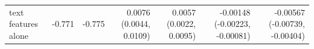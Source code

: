 \begin{tabular}{lrrrrrr}
text features alone & -0.771 & -0.775 & 0.0076 (0.0044, 0.0109) & 0.0057 (0.0022, 0.0095) & -0.00148 (-0.00223, -0.00081) & -0.00567 (-0.00739, -0.00404) \\

\end{tabular}
